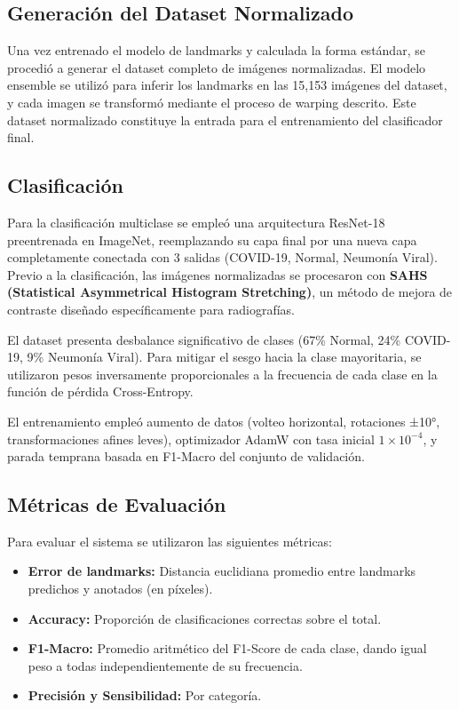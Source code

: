 \documentclass[runningheads]{llncs}
\begin{document}
\subsection{Generación del Dataset Normalizado}

Una vez entrenado el modelo de landmarks y calculada la forma estándar, se procedió a generar el dataset completo de imágenes normalizadas. El modelo ensemble se utilizó para inferir los landmarks en las 15,153 imágenes del dataset, y cada imagen se transformó mediante el proceso de warping descrito. Este dataset normalizado constituye la entrada para el entrenamiento del clasificador final.

\subsection{Clasificación}

Para la clasificación multiclase se empleó una arquitectura ResNet-18 preentrenada en ImageNet, reemplazando su capa final por una nueva capa completamente conectada con 3 salidas (COVID-19, Normal, Neumonía Viral). Previo a la clasificación, las imágenes normalizadas se procesaron con \textbf{SAHS (Statistical Asymmetrical Histogram Stretching)}, un método de mejora de contraste diseñado específicamente para radiografías.

El dataset presenta desbalance significativo de clases (67\% Normal, 24\% COVID-19, 9\% Neumonía Viral). Para mitigar el sesgo hacia la clase mayoritaria, se utilizaron pesos inversamente proporcionales a la frecuencia de cada clase en la función de pérdida Cross-Entropy.

El entrenamiento empleó aumento de datos (volteo horizontal, rotaciones ±10°, transformaciones afines leves), optimizador AdamW \cite{loshchilov2019adamw} con tasa inicial $1 \times 10^{-4}$, y parada temprana basada en F1-Macro del conjunto de validación.

\subsection{Métricas de Evaluación}

Para evaluar el sistema se utilizaron las siguientes métricas:

\begin{itemize}
    \item \textbf{Error de landmarks:} Distancia euclidiana promedio entre landmarks predichos y anotados (en píxeles).
    \item \textbf{Accuracy:} Proporción de clasificaciones correctas sobre el total.
    \item \textbf{F1-Macro:} Promedio aritmético del F1-Score de cada clase, dando igual peso a todas independientemente de su frecuencia.
    \item \textbf{Precisión y Sensibilidad:} Por categoría.
\end{itemize}
\end{document}
